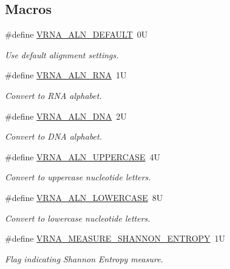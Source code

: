 \subsection*{Macros}
\begin{DoxyCompactItemize}
\item 
\mbox{\label{group__aln__utils_ga7437bcbc3142b266f1f3b086eb669092}} 
\#define \mbox{\hyperlink{group__aln__utils_ga7437bcbc3142b266f1f3b086eb669092}{V\+R\+N\+A\+\_\+\+A\+L\+N\+\_\+\+D\+E\+F\+A\+U\+LT}}~0U
\begin{DoxyCompactList}\small\item\em Use default alignment settings. \end{DoxyCompactList}\item 
\mbox{\label{group__aln__utils_ga1a2aa60bcc51dc8e48c07bf146bd28c1}} 
\#define \mbox{\hyperlink{group__aln__utils_ga1a2aa60bcc51dc8e48c07bf146bd28c1}{V\+R\+N\+A\+\_\+\+A\+L\+N\+\_\+\+R\+NA}}~1U
\begin{DoxyCompactList}\small\item\em Convert to R\+NA alphabet. \end{DoxyCompactList}\item 
\mbox{\label{group__aln__utils_ga36affc310a5adedf1bdbf9669dd4bf85}} 
\#define \mbox{\hyperlink{group__aln__utils_ga36affc310a5adedf1bdbf9669dd4bf85}{V\+R\+N\+A\+\_\+\+A\+L\+N\+\_\+\+D\+NA}}~2U
\begin{DoxyCompactList}\small\item\em Convert to D\+NA alphabet. \end{DoxyCompactList}\item 
\mbox{\label{group__aln__utils_ga0de72fc917d72acafe862750a3a5e0bc}} 
\#define \mbox{\hyperlink{group__aln__utils_ga0de72fc917d72acafe862750a3a5e0bc}{V\+R\+N\+A\+\_\+\+A\+L\+N\+\_\+\+U\+P\+P\+E\+R\+C\+A\+SE}}~4U
\begin{DoxyCompactList}\small\item\em Convert to uppercase nucleotide letters. \end{DoxyCompactList}\item 
\mbox{\label{group__aln__utils_ga27eb303be3c8368c9e8be76a4d6ca35e}} 
\#define \mbox{\hyperlink{group__aln__utils_ga27eb303be3c8368c9e8be76a4d6ca35e}{V\+R\+N\+A\+\_\+\+A\+L\+N\+\_\+\+L\+O\+W\+E\+R\+C\+A\+SE}}~8U
\begin{DoxyCompactList}\small\item\em Convert to lowercase nucleotide letters. \end{DoxyCompactList}\item 
\#define \mbox{\hyperlink{group__aln__utils_ga1e659227c9fc077d29989f576f129000}{V\+R\+N\+A\+\_\+\+M\+E\+A\+S\+U\+R\+E\+\_\+\+S\+H\+A\+N\+N\+O\+N\+\_\+\+E\+N\+T\+R\+O\+PY}}~1U
\begin{DoxyCompactList}\small\item\em Flag indicating Shannon Entropy measure. \end{DoxyCompactList}\end{DoxyCompactItemize}
